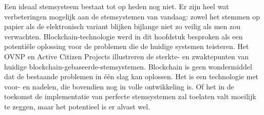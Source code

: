 	Een ideaal stemsysteem bestaat tot op heden nog niet. Er zijn heel wat verbeteringen mogelijk aan de stemsystemen van vandaag: zowel het stemmen op papier als de elektronisch variant blijken bijlange niet zo veilig als men zou verwachten. Blockchain-technologie werd in dit hoofdstuk besproken als een potentiële oplossing voor de problemen die de huidige systemen teisteren. Het OVNP en Active Citizen Projects illustreren de sterkte- en zwaktepunten van huidige blockchain-gebaseerde-stemsystemen. Blockchain is geen wondermiddel dat de bestaande problemen in één slag kan oplossen. Het is een technologie met  voor- en nadelen, die bovendien nog in volle ontwikkeling is. Of het in de toekomst de implementatie van perfecte stemsystemen zal toelaten valt moeilijk te zeggen, maar het potentieel is er alvast wel. 
	
	

	
	
	
		
		
		
		
		
		
	
